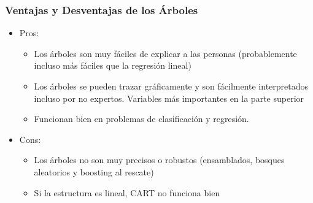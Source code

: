 \documentclass[
  shownotes,
  xcolor={svgnames},
  hyperref={colorlinks,citecolor=DarkBlue,linkcolor=DarkRed,urlcolor=DarkBlue}
  , aspectratio=169]{beamer}
\begin{document}
\begin{frame}[fragile]
\frametitle{Ventajas y Desventajas de los Árboles}

\begin{itemize}
\item Pros: 
  \begin{itemize}
    \item Los árboles son muy fáciles de explicar a las personas (probablemente incluso más fáciles que la regresión lineal)
    \medskip
    \item Los árboles se pueden trazar gráficamente y son fácilmente interpretados incluso por no expertos. Variables más importantes en la parte superior
    \medskip
    \item Funcionan bien en problemas de clasificación y regresión.
  \end{itemize}

\bigskip
\item  Cons:
  \begin{itemize}
    \item Los árboles no son muy precisos o robustos (ensamblados, bosques aleatorios y boosting al rescate)
    \medskip
    \item Si la estructura es lineal, CART no funciona bien
  \end{itemize}
\end{itemize}

\end{frame}

\end{document}
